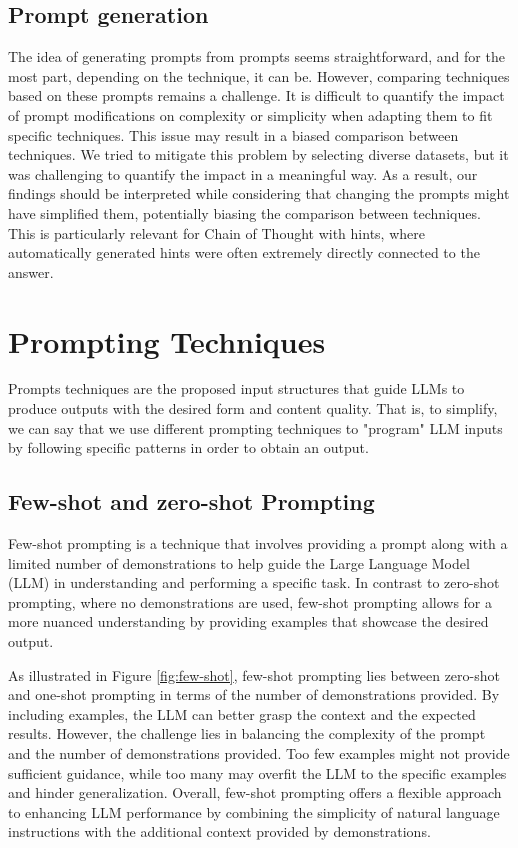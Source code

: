 \documentclass[fleqn,moreauthors,10pt]{ds_report}
\begin{document}
\subsection*{Prompt generation}
The idea of generating prompts from prompts seems straightforward, and for the most part, depending on the technique, it can be. However, comparing techniques based on these prompts remains a challenge. It is difficult to quantify the impact of prompt modifications on complexity or simplicity when adapting them to fit specific techniques. This issue may result in a biased comparison between techniques. We tried to mitigate this problem by selecting diverse datasets, but it was challenging to quantify the impact in a meaningful way. As a result, our findings should be interpreted while considering that changing the prompts might have simplified them, potentially biasing the comparison between techniques. This is particularly relevant for Chain of Thought with hints, where automatically generated hints were often extremely directly connected to the answer.


\section*{Prompting Techniques}
Prompts techniques are the proposed input structures that guide LLMs to produce outputs with the desired form and content quality. That is, to simplify, we can say that we use different prompting techniques to "program" LLM inputs by following specific patterns in order to obtain an output. \cite{prompttechniques}

\subsection*{Few-shot and zero-shot Prompting}
Few-shot prompting \cite{Few-shot} is a technique that involves providing a prompt along with a limited number of demonstrations to help guide the Large Language Model (LLM) in understanding and performing a specific task. In contrast to zero-shot prompting, where no demonstrations are used, few-shot prompting allows for a more nuanced understanding by providing examples that showcase the desired output.

As illustrated in Figure \ref{fig:few-shot}, few-shot prompting lies between zero-shot and one-shot prompting in terms of the number of demonstrations provided. By including examples, the LLM can better grasp the context and the expected results. However, the challenge lies in balancing the complexity of the prompt and the number of demonstrations provided. Too few examples might not provide sufficient guidance, while too many may overfit the LLM to the specific examples and hinder generalization.
Overall, few-shot prompting offers a flexible approach to enhancing LLM performance by combining the simplicity of natural language instructions with the additional context provided by demonstrations.
\end{document}
